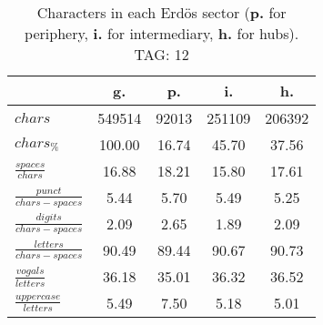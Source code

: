 \begin{table}[h!]
\begin{center}
\begin{tabular}{| l | c | c | c | c |}\hline
 & g. & p. & i. & h. \\\hline
$chars$ & 549514  & 92013  & 251109  & 206392 \\\hline
$chars_{\%}$ & 100.00  & 16.74  & 45.70  & 37.56 \\\hline
$\frac{spaces}{chars}$ & 16.88  & 18.21  & 15.80  & 17.61 \\\hline
$\frac{punct}{chars-spaces}$ & 5.44  & 5.70  & 5.49  & 5.25 \\\hline
$\frac{digits}{chars-spaces}$ & 2.09  & 2.65  & 1.89  & 2.09 \\\hline
$\frac{letters}{chars-spaces}$ & 90.49  & 89.44  & 90.67  & 90.73 \\\hline
$\frac{vogals}{letters}$ & 36.18  & 35.01  & 36.32  & 36.52 \\\hline
$\frac{uppercase}{letters}$ & 5.49  & 7.50  & 5.18  & 5.01 \\\hline
\end{tabular}
\caption{Characters in each Erd\"os sector ({{\bf p.}} for periphery, {{\bf i.}} for intermediary, 
    {{\bf h.}} for hubs). TAG: 12}
\end{center}
\end{table}